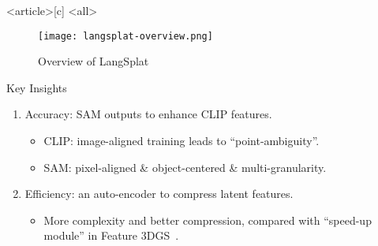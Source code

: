 
\begin{frame}<article>[c]
	\mode<all>{}%
	\begin{figure}[htbp]
		\centering
		\begin{annotatedFigureEnv}
			{\texttt{[image: langsplat-overview.png]}}
		\end{annotatedFigureEnv}
		\vspace*{0.5ex}
        \caption{Overview of LangSplat~\autocite{qinLangSplat3DLanguage2023}}
        \label{fig:langsplat-overview}
	\end{figure}
	\begin{block}{Key Insights}
		\begin{enumerate}
			\item \alert{Accuracy:} SAM outputs to enhance CLIP features.
			      \begin{itemize}
				      \item \alert{CLIP:} image-aligned training leads to ``point-ambiguity''.
				      \item \alert{SAM:} pixel-aligned \& object-centered \& multi-granularity.
			      \end{itemize}
			\item \alert{Efficiency:} an \alert{auto-encoder} to compress latent features.
			      \begin{itemize}
				      \item More complexity and better compression, compared with ``speed-up module'' in Feature 3DGS~\autocite{zhouFeature3DGSSupercharging2024apr}.
			      \end{itemize}
		\end{enumerate}
	\end{block}
\end{frame}

